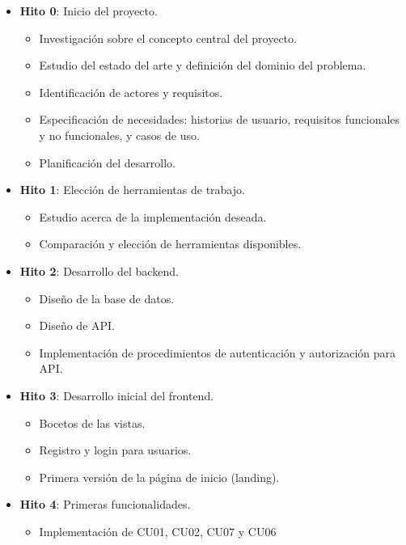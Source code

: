 \begin{itemize}
	\item \textbf{Hito 0}: Inicio del proyecto.
	\begin{itemize} 
		\item Investigación sobre el concepto central del proyecto. 
		\item Estudio del estado del arte y definición del dominio del problema. 
		\item Identificación de actores y requisitos. 
		\item Especificación de necesidades: historias de usuario, requisitos funcionales y no funcionales, y casos de uso. 
		\item Planificación del desarrollo. 
	\end{itemize}

	\item  \textbf{Hito 1}: Elección de herramientas de trabajo.
	\begin{itemize}
		\item Estudio acerca de la implementación deseada.
		\item Comparación y elección de herramientas disponibles.
	\end{itemize}

	\item  \textbf{Hito 2}: Desarrollo del backend.
	\begin{itemize}
		\item Diseño de la base de datos.
		\item Diseño de API.
		\item Implementación de procedimientos de autenticación y autorización para API.
	\end{itemize}

	
	\item  \textbf{Hito 3}: Desarrollo inicial del frontend.
	\begin{itemize}
		\item Bocetos de las vistas.
		\item Registro y login para usuarios.
		\item Primera versión de la página de inicio (landing).
	\end{itemize}

	\item \textbf{Hito 4}: Primeras funcionalidades.
	\begin{itemize}
		\item Implementación de CU01, CU02, CU07 y CU06
	\end{itemize}


\end{itemize}
